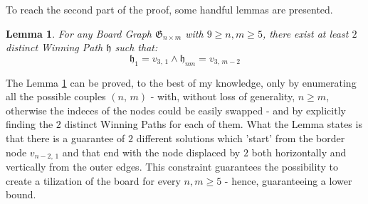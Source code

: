 \documentclass[conference]{IEEEtran}
\newtheorem{lemma}{Lemma}[section]
\begin{document}
To reach the second part of the proof, some handful lemmas are presented.

\begin{lemma} \label{lem:two_boards_horizontal}
    For any Board Graph $\mathfrak{G}_{n \times m}$ with $9 \ge n, m \ge 5$, there exist at least $2$ distinct Winning Path $\mathfrak{h}$ such that:
    $$
        \mathfrak{h}_1 = v_{3,\,1} \land \mathfrak{h}_{nm} = v_{3,\,m-2} 
    $$
\end{lemma}

The Lemma \ref{lem:two_boards_horizontal} can be proved, to the best of my knowledge, only by enumerating all the possible couples $(n,\,m)$ - with, without loss of generality, $n \ge m$, otherwise the indeces of the nodes could be easily swapped -
and by explicitly finding the $2$ distinct Winning Paths for each of them.
What the Lemma states is that there is a guarantee of $2$ different solutions which 'start' from the border node $v_{n-2,\,1}$ and that end with the node displaced by $2$ both horizontally and vertically from the outer edges.
This constraint guarantees the possibility to create a tilization of the board for every $n, m \ge 5$ - hence, guaranteeing a lower bound.
\end{document}
